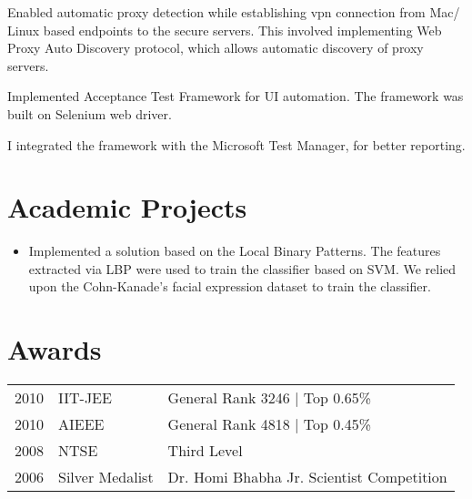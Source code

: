 \documentclass[]{deedy-resume-openfont}
\begin{document}
\begin{minipage}[t]{0.66\textwidth}
\begin{tightemize}
\vspace{1.0mm}
\item Enabled automatic proxy detection while establishing vpn connection from Mac/ Linux based endpoints to the secure servers. This involved implementing Web Proxy Auto Discovery protocol, which allows automatic discovery of proxy servers.
\end{tightemize}
\sectionsep

\begin{tightemize}
\item Implemented Acceptance Test Framework for UI automation. The framework was built on Selenium web driver.
\vspace{1.0mm}
\item I integrated the framework with the Microsoft Test Manager, for better reporting.

\end{tightemize}
\sectionsep

\section{Academic Projects}
\vspace{2.0mm}
\begin{itemize}
\item Implemented a solution based on the Local Binary Patterns. The features extracted via LBP were used to train the classifier based on SVM. We relied upon the Cohn-Kanade's facial expression dataset to train the classifier.
\end{itemize}
\sectionsep



\section{Awards} 
\vspace{2.0mm}
\begin{tabular}{rll}
2010	     & IIT-JEE  & General Rank 3246 | Top 0.65\%\\
2010	     & AIEEE  & General Rank 4818 | Top 0.45\%\\
2008         & NTSE & Third Level \\
2006         & Silver Medalist & Dr. Homi Bhabha Jr. Scientist Competition
\end{tabular}
\sectionsep

\end{minipage} 
\end{document}
